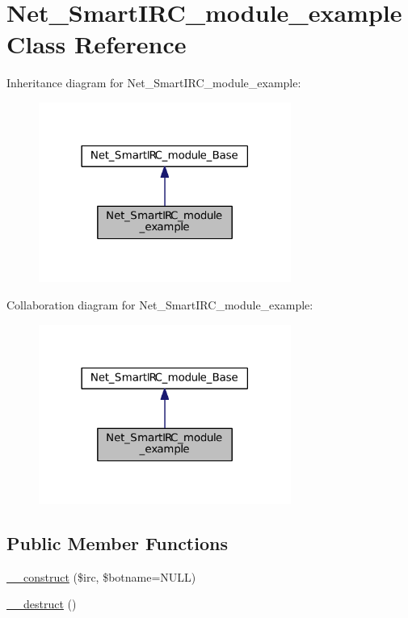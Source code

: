 \hypertarget{classNet__SmartIRC__module__example}{}\section{Net\+\_\+\+Smart\+I\+R\+C\+\_\+module\+\_\+example Class Reference}
\label{classNet__SmartIRC__module__example}


Inheritance diagram for Net\+\_\+\+Smart\+I\+R\+C\+\_\+module\+\_\+example\+:
\nopagebreak
\begin{figure}[H]
\begin{center}
\leavevmode
\includegraphics[width=234pt]{dd/de7/classNet__SmartIRC__module__example__inherit__graph}
\end{center}
\end{figure}


Collaboration diagram for Net\+\_\+\+Smart\+I\+R\+C\+\_\+module\+\_\+example\+:
\nopagebreak
\begin{figure}[H]
\begin{center}
\leavevmode
\includegraphics[width=234pt]{df/de1/classNet__SmartIRC__module__example__coll__graph}
\end{center}
\end{figure}
\subsection*{Public Member Functions}
\begin{DoxyCompactItemize}
\item 
\hyperlink{classNet__SmartIRC__module__example_a25a67cf46cdfe345aa4bcf0d48a0b166}{\+\_\+\+\_\+construct} (\$irc, \$botname=N\+U\+LL)
\item 
\hyperlink{classNet__SmartIRC__module__example_a20445df064117b852223745ba9a2aa22}{\+\_\+\+\_\+destruct} ()
\end{DoxyCompactItemize}
